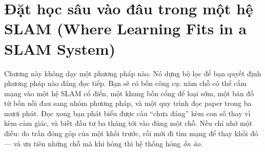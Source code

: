 \documentclass[../../deep_learning.tex]{subfiles}
\begin{document}
\chapter{Đặt học sâu vào đâu trong một hệ SLAM (Where Learning Fits in a SLAM System)}

\begin{tomtat}
Chương này không dạy một phương pháp nào. Nó dựng bộ lọc để bạn quyết định phương pháp nào đáng đọc tiếp. Bạn sẽ có bốn công cụ: năm chỗ có thể cắm mạng vào một hệ SLAM cổ điển, một khung bốn cổng để loại sớm, một bản đồ từ bốn nỗi đau sang nhóm phương pháp, và một quy trình đọc paper trong ba mươi phút. Đọc xong bạn phát biểu được câu ``chưa đáng'' kèm con số thay vì kèm cảm giác, và biết đầu tư ba tháng tới vào đúng một chỗ. Nếu chỉ nhớ một điều: đo trần đóng góp của một khối trước, rồi mới đi tìm mạng để thay khối đó --- và ưu tiên những chỗ mà khi hỏng thì hệ thống hỏng \emph{ồn ào}.
\end{tomtat}
\end{document}
